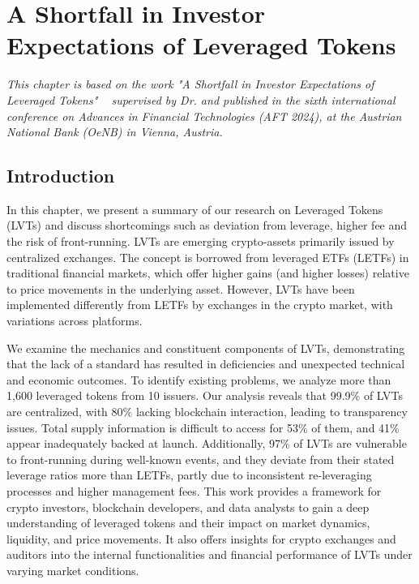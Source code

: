 
\chapter{A Shortfall in Investor Expectations of Leveraged Tokens}\label{ch:shortfall}

\textit{This chapter is based on the work "A Shortfall in Investor Expectations of Leveraged Tokens" ~\cite{shortfall} supervised by Dr. \supv and published in the sixth international conference on Advances in Financial Technologies (AFT 2024), at the Austrian National Bank (OeNB) in Vienna, Austria.}

\section{Introduction}
In this chapter, we present a summary of our research on Leveraged Tokens (LVTs) and discuss shortcomings such as deviation from leverage, higher fee and the risk of front-running. LVTs are emerging crypto-assets primarily issued by centralized exchanges. The concept is borrowed from leveraged ETFs (LETFs) in traditional financial markets, which offer higher gains (and higher losses) relative to price movements in the underlying asset. However, LVTs have been implemented differently from LETFs by exchanges in the crypto market, with variations across platforms.

We examine the mechanics and constituent components of LVTs, demonstrating that the lack of a standard has resulted in deficiencies and unexpected technical and economic outcomes. To identify existing problems, we analyze more than 1,600 leveraged tokens from 10 issuers. Our analysis reveals that 99.9\% of LVTs are centralized, with 80\% lacking blockchain interaction, leading to transparency issues. Total supply information is difficult to access for 53\% of them, and 41\% appear inadequately backed at launch. Additionally, 97\% of LVTs are vulnerable to front-running during well-known events, and they deviate from their stated leverage ratios more than LETFs, partly due to inconsistent re-leveraging processes and higher management fees. This work provides a framework for crypto investors, blockchain developers, and data analysts to gain a deep understanding of leveraged tokens and their impact on market dynamics, liquidity, and price movements. It also offers insights for crypto exchanges and auditors into the internal functionalities and financial performance of LVTs under varying market conditions.

